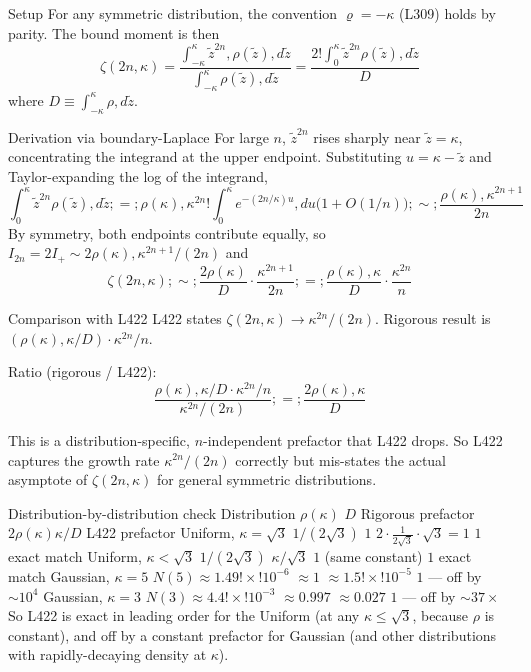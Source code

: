 \documentclass[twoside]{article}
\numberwithin{equation}{section}
\begin{document}
Setup
For any symmetric distribution, the convention $\varrho = -\kappa$ (L309) holds by parity. The bound moment is then
$$\zeta(2n,\kappa) = \frac{\int_{-\kappa}^{\kappa}\tilde z^{2n},\rho(\tilde z),d\tilde z}{\int_{-\kappa}^{\kappa}\rho(\tilde z),d\tilde z} = \frac{2!\int_0^{\kappa}\tilde z^{2n}\rho(\tilde z),d\tilde z}{D}$$
where $D \equiv \int_{-\kappa}^{\kappa}\rho,d\tilde z$.

Derivation via boundary-Laplace
For large $n$, $\tilde z^{2n}$ rises sharply near $\tilde z = \kappa$, concentrating the integrand at the upper endpoint. Substituting $u = \kappa - \tilde z$ and Taylor-expanding the log of the integrand,
$$\int_0^{\kappa}\tilde z^{2n}\rho(\tilde z),d\tilde z ;=; \rho(\kappa),\kappa^{2n}!\int_0^{\kappa} e^{-(2n/\kappa)u},du\bigl(1 + O(1/n)\bigr) ;\sim; \frac{\rho(\kappa),\kappa^{2n+1}}{2n}$$
By symmetry, both endpoints contribute equally, so $I_{2n} = 2I_+ \sim 2\rho(\kappa),\kappa^{2n+1}/(2n)$ and
$$\zeta(2n,\kappa) ;\sim; \frac{2\rho(\kappa)}{D}\cdot\frac{\kappa^{2n+1}}{2n} ;=; \frac{\rho(\kappa),\kappa}{D}\cdot\frac{\kappa^{2n}}{n}$$

Comparison with L422
L422 states $\zeta(2n,\kappa) \to \kappa^{2n}/(2n)$. Rigorous result is $(\rho(\kappa),\kappa/D)\cdot \kappa^{2n}/n$.

Ratio (rigorous / L422):
$$\frac{\rho(\kappa),\kappa/D \cdot \kappa^{2n}/n}{\kappa^{2n}/(2n)} ;=; \frac{2\rho(\kappa),\kappa}{D}$$

This is a distribution-specific, $n$-independent prefactor that L422 drops. So L422 captures the growth rate $\kappa^{2n}/(2n)$ correctly but mis-states the actual asymptote of $\zeta(2n,\kappa)$ for general symmetric distributions.

Distribution-by-distribution check
Distribution	$\rho(\kappa)$	$D$	Rigorous prefactor $2\rho(\kappa)\kappa/D$	L422 prefactor
Uniform, $\kappa = \sqrt 3$	$1/(2\sqrt 3)$	$1$	$2\cdot\tfrac{1}{2\sqrt 3}\cdot\sqrt 3 = 1$	$1$  exact match
Uniform, $\kappa < \sqrt 3$	$1/(2\sqrt 3)$	$\kappa/\sqrt 3$	$1$ (same constant)	$1$  exact match
Gaussian, $\kappa=5$	$N(5)\approx 1.49!\times!10^{-6}$	$\approx 1$	$\approx 1.5!\times!10^{-5}$	$1$ — off by $\sim 10^{4}$
Gaussian, $\kappa=3$	$N(3)\approx 4.4!\times!10^{-3}$	$\approx 0.997$	$\approx 0.027$	$1$ — off by $\sim 37\times$
So L422 is exact in leading order for the Uniform (at any $\kappa\le\sqrt 3$, because $\rho$ is constant), and off by a constant prefactor for Gaussian (and other distributions with rapidly-decaying density at $\kappa$).
\end{document}
